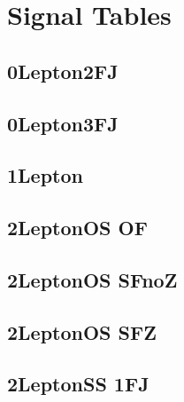\documentclass[landscape, 12pt,letterpaper]{article}
\begin{document}
\section{Signal Tables}
\subsection{0Lepton2FJ }

\newpage

\subsection{0Lepton3FJ }

\newpage

\subsection{1Lepton }

\newpage

\subsection{2LeptonOS OF}

\newpage

\subsection{2LeptonOS SFnoZ}

\newpage

\subsection{2LeptonOS SFZ}

\newpage

\subsection{2LeptonSS 1FJ}

\newpage
\end{document}
